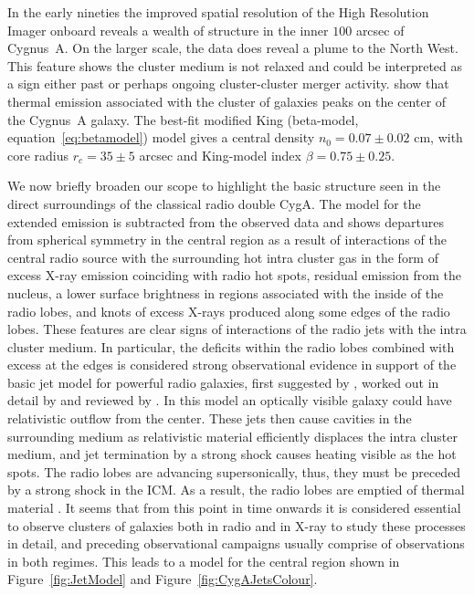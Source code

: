 \documentclass[MScProj_TLRH_ClusterEnergy.tex]{subfiles}
\begin{document}
In the early nineties the improved spatial resolution of the High Resolution Imager
onboard  reveals a wealth of structure in the inner \mytilde $100$ arcsec
of Cygnus~A. On the larger scale, the  data does reveal a plume to the
North West. This feature shows the cluster medium is not relaxed and could be
interpreted as a sign either past or perhaps ongoing cluster-cluster merger activity.
\citet{1994MNRAS.270..173C} show that thermal emission associated with 
the cluster of galaxies peaks on the center of the Cygnus~A galaxy. The best-fit
modified King (beta-model, equation~\eqref{eq:betamodel}) model gives a central
density $n_0 = 0.07 \pm 0.02$ cm, with core radius $r_c = 35 \pm 5$ 
arcsec and King-model index $\beta = 0.75 \pm 0.25$.

We now briefly broaden our scope to highlight the basic structure seen in the direct
surroundings of the classical radio double CygA. The model for the extended emission 
is subtracted from the observed data and shows departures from spherical symmetry in
the central region as a result of interactions of the central radio source with the 
surrounding hot intra cluster gas in the form of excess X-ray
emission coinciding with radio hot spots, residual emission from the nucleus, a lower surface
brightness in regions associated with the inside of the radio lobes, and knots of excess
X-rays produced along some edges of the radio lobes. These features are clear signs of 
interactions of the radio jets with the intra cluster medium. In particular, the deficits 
within the radio lobes combined with excess at the edges is considered strong observational 
evidence in support of the basic jet model for powerful radio galaxies,
first suggested by \citet{1973MNRAS.164..243L, 1974MNRAS.166..305H}, worked out in detail by
\citet{1974MNRAS.169..395B, 1974MNRAS.166..513S} and reviewed by \citet{1984RvMP...56..255B}.
In this model an optically visible galaxy could have relativistic outflow from the center. 
These jets then cause cavities in the surrounding medium as relativistic material efficiently 
displaces the intra cluster medium, and jet termination by a strong shock causes heating visible 
as the hot spots. The radio lobes are advancing supersonically, thus, they must be preceded
by a strong shock in the ICM. As a result, the radio lobes are emptied of
thermal material \citep{1987ApJ...316..611D}. It seems that from this point in time 
onwards it is considered essential to observe clusters of galaxies both in radio and in
X-ray to study these processes in detail, and preceding observational campaigns usually
comprise of observations in both regimes. This leads to a model for the central
region shown in Figure~\ref{fig:JetModel} and Figure~\ref{fig:CygAJetsColour}. 
\end{document}

